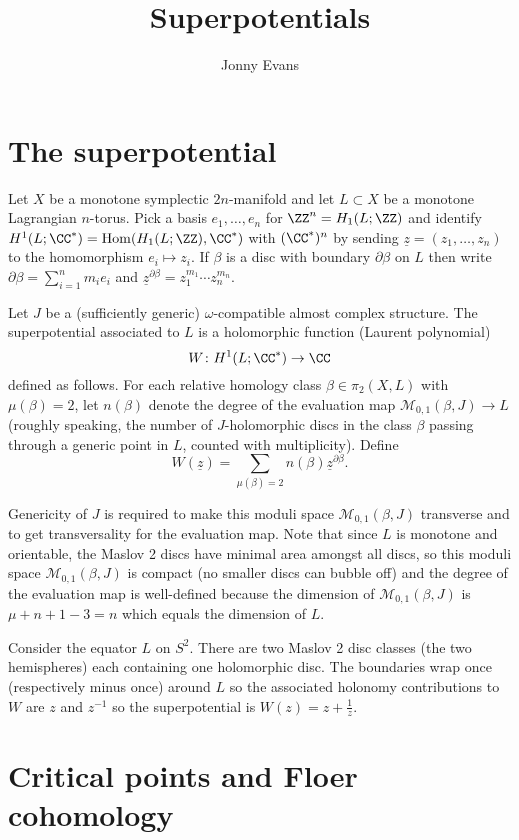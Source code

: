 \documentclass{amsart}
\title{Superpotentials}
\author{Jonny Evans}
\begin{document}
\section{The superpotential}

Let $X$ be a monotone symplectic $2n$-manifold and let $L\subset X$ be a monotone Lagrangian $n$-torus. Pick a basis $e_1,\ldots,e_n$ for $\ZZ^n=H_1(L;\ZZ)$ and identify $H^1(L;\CC^*)=\mathrm{Hom}(H_1(L;\ZZ),\CC^*)$ with $(\CC^*)^n$ by sending $\underline{z}=(z_1,\ldots,z_n)$ to the homomorphism $e_i\mapsto z_i$. If $\beta$ is a disc with boundary $\partial\beta$ on $L$ then write $\partial\beta=\sum_{i=1}^nm_ie_i$ and $\underline{z}^{\partial\beta}=z_1^{m_1}\cdots z_n^{m_n}$.

\begin{Definition}
  Let $J$ be a (sufficiently generic) $\omega$-compatible almost complex structure. The superpotential associated to $L$ is a holomorphic function (Laurent polynomial)
  \[W\colon H^1(L;\CC^*)\to\CC\]
  defined as follows. For each relative homology class $\beta\in\pi_2(X,L)$ with $\mu(\beta)=2$, let $n(\beta)$ denote the degree of the evaluation map $\mathcal{M}_{0,1}(\beta,J)\to L$ (roughly speaking, the number of $J$-holomorphic discs in the class $\beta$ passing through a generic point in $L$, counted with multiplicity). Define
  \[W(\underline{z})=\sum_{\mu(\beta)=2}n(\beta)\underline{z}^{\partial\beta}.\]
\end{Definition}

Genericity of $J$ is required to make this moduli space $\mathcal{M}_{0,1}(\beta,J)$ transverse and to get transversality for the evaluation map. Note that since $L$ is monotone and orientable, the Maslov 2 discs have minimal area amongst all discs, so this moduli space $\mathcal{M}_{0,1}(\beta,J)$ is compact (no smaller discs can bubble off) and the degree of the evaluation map is well-defined because the dimension of $\mathcal{M}_{0,1}(\beta,J)$ is $\mu+n+1-3=n$ which equals the dimension of $L$.

\begin{Example}
  Consider the equator $L$ on $S^2$. There are two Maslov 2 disc classes (the two hemispheres) each containing one holomorphic disc. The boundaries wrap once (respectively minus once) around $L$ so the associated holonomy contributions to $W$ are $z$ and $z^{-1}$ so the superpotential is $W(z)=z+\frac{1}{z}$.
\end{Example}

\section{Critical points and Floer cohomology}
\end{document}
